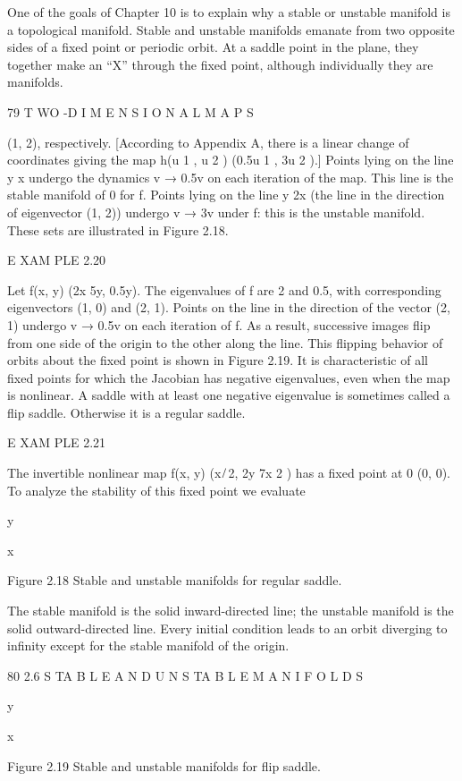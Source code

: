 \documentclass[12pt]{article}
\begin{document}
One of the goals of Chapter 10 is to explain why a stable or unstable manifold is a topological manifold. Stable and unstable 
manifolds emanate from two opposite sides of a ﬁxed point or periodic orbit. At a saddle point in the plane, they together make an 
“X” through the ﬁxed point, although individually they are manifolds.

79 T WO -D I M E N S I O N A L M A P S

(1, 2), respectively. [According to Appendix A, there is a linear change of coordinates giving the map h(u 1 , u 2 )  (0.5u 1 , 3u 2 
).] Points lying on the line y  x undergo the dynamics v → 0.5v on each iteration of the map. This line is the stable manifold of 0 
for f. Points lying on the line y  2x (the line in the direction of eigenvector (1, 2)) undergo v → 3v under f: this is the unstable 
manifold. These sets are illustrated in Figure 2.18.

E XAM PLE 2.20

Let f(x, y)  (2x  5y, 0.5y). The eigenvalues of f are 2 and 0.5, with corresponding eigenvectors (1, 0) and (2, 1). Points on the 
line in the direction of the vector (2, 1) undergo v → 0.5v on each iteration of f. As a result, successive images ﬂip from one 
side of the origin to the other along the line. This ﬂipping behavior of orbits about the ﬁxed point is shown in Figure 2.19. It is 
characteristic of all ﬁxed points for which the Jacobian has negative eigenvalues, even when the map is nonlinear. A saddle with at 
least one negative eigenvalue is sometimes called a ﬂip saddle. Otherwise it is a regular saddle.

E XAM PLE 2.21

The invertible nonlinear map f(x, y)  (x ̸ 2, 2y  7x 2 ) has a ﬁxed point at 0  (0, 0). To analyze the stability of this ﬁxed point 
we evaluate

y

x

Figure 2.18 Stable and unstable manifolds for regular saddle.

The stable manifold is the solid inward-directed line; the unstable manifold is the solid outward-directed line. Every initial 
condition leads to an orbit diverging to inﬁnity except for the stable manifold of the origin.

80 2.6 S TA B L E A N D U N S TA B L E M A N I F O L D S

y

x

Figure 2.19 Stable and unstable manifolds for ﬂip saddle.
\end{document}
